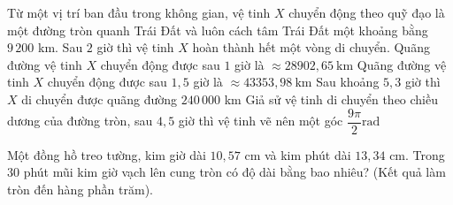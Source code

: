 \begin{ex}%
	Từ một vị trí ban đầu trong không gian, vệ tinh $X$ chuyển động theo  quỹ đạo là một đường tròn quanh Trái Đất và luôn cách tâm Trái Đất một khoảng bằng $9\,200$ km. Sau $2$ giờ thì vệ tinh $X$ hoàn thành hết một vòng di chuyển.
	\choiceTF 
		{\True Quãng đường vệ  tinh $X$ chuyển động được sau $1$ giờ là $\approx 28902{,}65\mathrm{~km}$}
		{\True Quãng đường vệ tinh $X$ chuyển động  được sau $1{,}5$ giờ là $\approx 43353{,}98\mathrm{~km}$}
		{Sau khoảng $5{,}3$ giờ thì $X$ di chuyển được quãng đường  $240\,000$ km}
		{\True Giả sử vệ tinh di chuyển theo chiều dương của đường  tròn, sau $4{,}5$ giờ thì vệ tinh vẽ nên một góc $\dfrac{9\pi}{2} \mathrm{rad}$}
\end{ex}



\begin{ex}%
	Một đồng hồ treo tường, kim giờ dài $10{,}57$ cm và kim phút dài $13{,}34$ cm. Trong $30$ phút mũi kim giờ vạch lên cung tròn có độ dài bằng bao nhiêu? (Kết quả làm tròn đến hàng phần  trăm).
\end{ex}

